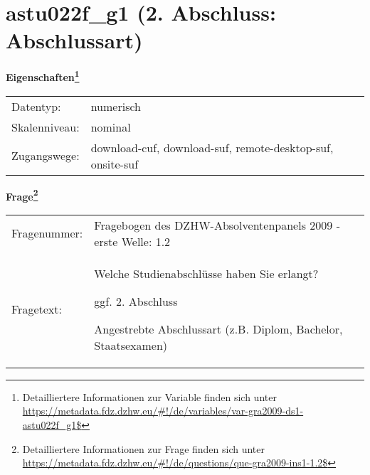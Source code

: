 
    \setcounter{footnote}{0}

    \vspace*{-1.8cm}
	\section{astu022f\_g1 (2. Abschluss: Abschlussart)}
	\label{section:astu022f_g1}



    \vspace*{0.5cm}
    \noindent\textbf{Eigenschaften\footnote{Detailliertere Informationen zur Variable finden sich unter
		\url{https://metadata.fdz.dzhw.eu/\#!/de/variables/var-gra2009-ds1-astu022f_g1$}}}\\
	\begin{tabularx}{\hsize}{@{}lX}
	Datentyp: & numerisch \\
	Skalenniveau: & nominal \\
	Zugangswege: &
	  download-cuf, 
	  download-suf, 
	  remote-desktop-suf, 
	  onsite-suf
 \\
    \end{tabularx}



				\vspace*{0.5cm}
                \noindent\textbf{Frage\footnote{Detailliertere Informationen zur Frage finden sich unter
		              \url{https://metadata.fdz.dzhw.eu/\#!/de/questions/que-gra2009-ins1-1.2$}}}\\
				\begin{tabularx}{\hsize}{@{}lX}
					Fragenummer: &
					  Fragebogen des DZHW-Absolventenpanels 2009 - erste Welle:
					  1.2
 \\
					Fragetext: & Welche Studienabschlüsse haben Sie erlangt?\par  ggf. 2. Abschluss\par  Angestrebte Abschlussart (z.B. Diplom, Bachelor, Staatsexamen) \\
				\end{tabularx}






